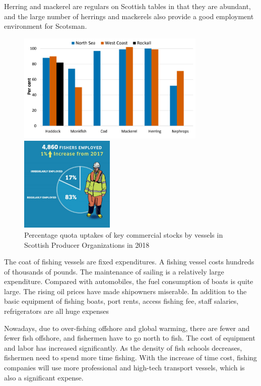 \documentclass{mcmthesis}
\begin{document}
Herring and mackerel are regulars on Scottish tables in that they are abundant, and the large number of herrings and mackerels also provide a good employment environment for Scotsman.

			\begin{figure}[htbp]
				\centering
				\begin{minipage}[c]{0.5\textwidth}
					\centering
					\includegraphics[width=9cm]{./picture/figure5.png}
				\end{minipage}%
				\begin{minipage}[c]{0.5\textwidth}
					\centering
					\includegraphics[width=4.5cm]{./picture/figure6.png}
				\end{minipage}
				\caption{Percentage quota uptakes of key commercial stocks by vessels in Scottish Producer Organizations in 2018}
			\end{figure}
			
The coat of fishing vessels are fixed expenditures. A fishing vessel costs hundreds of thousands of pounds. The maintenance of sailing is a relatively large expenditure. Compared with automobiles, the fuel consumption of boats is quite large. The rising oil prices have made shipowners miserable.
In addition to the basic equipment of fishing boats, port rents, access fishing fee, staff salaries, refrigerators are all huge expenses

Nowadays, due to over-fishing offshore and global warming, there are fewer and fewer fish  offshore, and fishermen have to go north to fish. The cost of equipment and labor has increased significantly. As the density of fish schools decreases, fishermen need to spend more time fishing. With the increase of time cost, fishing companies will use more professional and high-tech transport vessels, which is also a significant expense.
\end{document}
